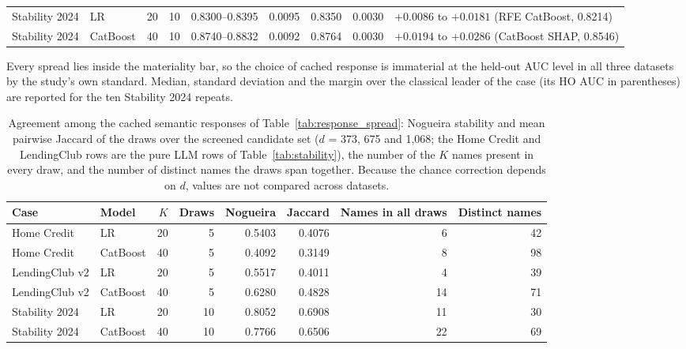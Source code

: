 \documentclass[final,5p,twocolumn]{elsarticle}
\newcommand{\Kfeat}{K}
\providecommand{\DIFaddtex}[1]{{\protect\color{blue} \sf #1}} %
\providecommand{\DIFaddbegin}{} %
\providecommand{\DIFaddFL}[1]{\DIFadd{#1}} %
\providecommand{\DIFaddbeginFL}{} %
\providecommand{\DIFaddendFL}{} %
\providecommand{\DIFadd}[1]{\texorpdfstring{\DIFaddtex{#1}}{#1}} %
\begin{document}
\begin{table}[htbp]
\begin{threeparttable}
\begin{tabular}{@{}llrrlrrrl@{}}
\addlinespace
Stability 2024 & LR & 20 & 10 & 0.8300--0.8395 & 0.0095 & 0.8350 & 0.0030 & $+0.0086$ to $+0.0181$ (RFE CatBoost, 0.8214) \\
Stability 2024 & CatBoost & 40 & 10 & 0.8740--0.8832 & 0.0092 & 0.8764 & 0.0030 & $+0.0194$ to $+0.0286$ (CatBoost SHAP, 0.8546) \\
\bottomrule
\end{tabular}
\DIFaddendFL \begin{tablenotes}\footnotesize
\item Every spread lies inside the materiality bar, so the choice of cached response is immaterial at the held-out AUC level in all three datasets by the study's own standard. \DIFaddbeginFL \DIFaddFL{Median, standard deviation and the margin over the classical leader of the case (its HO AUC in parentheses) are reported for the ten Stability 2024 repeats.
}\DIFaddendFL \end{tablenotes}
\end{threeparttable}
\end{table}

\DIFaddbegin \begin{table}[htbp]
\centering
\footnotesize
\begin{threeparttable}
\caption{\DIFaddFL{Agreement among the cached semantic responses of Table~\ref{tab:response_spread}: Nogueira stability and mean pairwise Jaccard of the draws over the screened candidate set ($d$ = 373, 675 and 1,068; the Home Credit and LendingClub rows are the pure LLM rows of Table~\ref{tab:stability}), the number of the $\Kfeat$ names present in every draw, and the number of distinct names the draws span together. Because the chance correction depends on $d$, values are not compared across datasets.}}
\label{tab:response_lists}
\setlength{\tabcolsep}{5pt}
\begin{tabular}{@{}llrrrrrr@{}}
\toprule
Case & Model & $\Kfeat$ & Draws & Nogueira & Jaccard & Names in all draws & Distinct names \\
\midrule
Home Credit & LR & 20 & 5 & 0.5403 & 0.4076 & 6 & 42 \\
Home Credit & CatBoost & 40 & 5 & 0.4092 & 0.3149 & 8 & 98 \\
LendingClub v2 & LR & 20 & 5 & 0.5517 & 0.4011 & 4 & 39 \\
LendingClub v2 & CatBoost & 40 & 5 & 0.6280 & 0.4828 & 14 & 71 \\
\addlinespace
Stability 2024 & LR & 20 & 10 & 0.8052 & 0.6908 & 11 & 30 \\
Stability 2024 & CatBoost & 40 & 10 & 0.7766 & 0.6506 & 22 & 69 \\
\bottomrule
\end{tabular}
\end{threeparttable}
\end{table}
\end{document}
